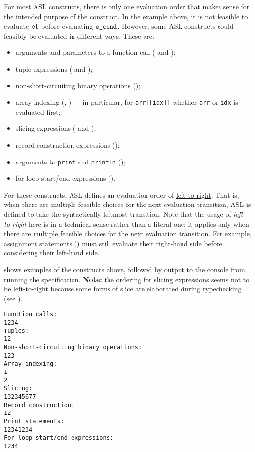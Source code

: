 For most ASL constructs, there is only one evaluation order that makes sense for the intended purpose of the construct.
In the example above, it is not feasible to evaluate $\texttt{e1}$ before evaluating $\texttt{e\_cond}$.
However, some ASL constructs could feasibly be evaluated in different ways.
These are:
\begin{itemize}
  \item arguments and parameters to a function call ( and );
  \item tuple expressions ( and );
  \item non-short-circuiting binary operations ();
  \item array-indexing (, ) --- in particular, for \verb|arr[[idx]]| whether \verb|arr| or \verb|idx| is evaluated first;
  \item slicing expressions ( and );
  \item record construction expressions ();
  \item arguments to \verb|print| and \verb|println| ();
  \item for-loop start/end expressions ().
\end{itemize}

For these constructs, ASL defines an evaluation order of \underline{left-to-right}.
That is, when there are multiple feasible choices for the next evaluation transition, ASL is defined to take the syntactically leftmost transition.
Note that the usage of \emph{left-to-right} here is in a technical sense rather than a literal one: it applies only when there are multiple feasible choices for the next evaluation transition.
For example, assignment statements () must still evaluate their right-hand side before considering their left-hand side.

 shows examples of the constructs above, followed by output to the console from running the specification.
\textbf{Note:} the ordering for slicing expressions seems not to be left-to-right because some forms of slice are elaborated during typechecking (see ).
\begin{Verbatim}[fontsize=\footnotesize, frame=single]
Function calls:
1234
Tuples:
12
Non-short-circuiting binary operations:
123
Array-indexing:
1
2
Slicing:
132345677
Record construction:
12
Print statements:
12341234
For-loop start/end expressions:
1234
\end{Verbatim}
